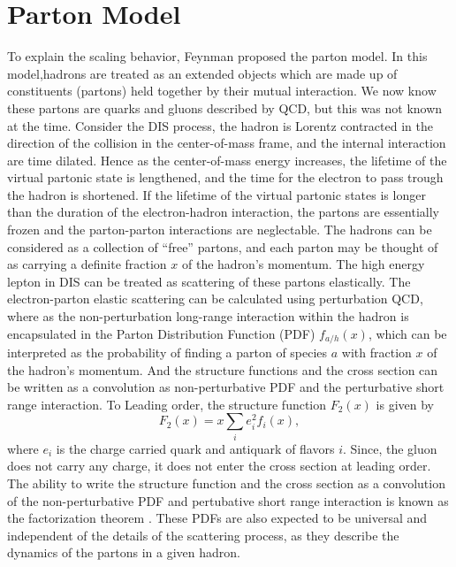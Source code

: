 \section{Parton Model}
\label{sec:parton}
To explain the scaling behavior, Feynman proposed the parton model\cite{feynman1969}.
In this model,hadrons are treated as an extended objects which are made up of 
constituents (partons) held together by their mutual interaction. We now know 
these partons are quarks and gluons described by QCD, but this was not known at 
the time. Consider the DIS process, the hadron is Lorentz contracted in the 
direction of the collision in the center-of-mass frame, and the internal 
interaction are time dilated. Hence as the center-of-mass energy increases, the 
lifetime of the virtual partonic state is lengthened, and the time for the 
electron to pass trough the hadron is shortened. If the lifetime of the virtual
partonic states is longer than the duration of the electron-hadron interaction,
the partons are essentially frozen and the parton-parton interactions are 
neglectable. The hadrons can be considered as a collection of ``free'' partons,
and each parton may be thought of as carrying a definite fraction $x$ of the 
hadron's momentum. The high energy lepton in DIS can be treated as scattering 
of these partons elastically. The electron-parton elastic scattering can be 
calculated using perturbation QCD, where as the non-perturbation long-range 
interaction within the hadron is encapsulated in the Parton Distribution
Function (PDF) $f_{a/h}\left(x\right)$, which can be interpreted as the probability 
of finding a parton of species $a$ with fraction $x$ of the hadron's momentum. 
And the structure functions and the cross section can be written as a convolution
as non-perturbative PDF and the perturbative short range interaction. To Leading
order, the structure function $F_2\left(x\right)$ is given by
\begin{equation}
F_2\left(x\right)=x\sum_i e^2_i f_i\left(x\right),
\label{eq:F2_parton}
\end{equation}
where $e_i$ is the charge carried quark and antiquark of flavors $i$. Since, the 
gluon does not carry any charge, it does not enter the cross section at leading 
order. The ability to write the structure function and the cross section as a 
convolution of the non-perturbative PDF and pertubative short range interaction
is known as the factorization theorem \cite{collins1989}. These PDFs are also 
expected to be universal and independent of the details of the scattering 
process, as they describe the dynamics of the partons in a given hadron.

